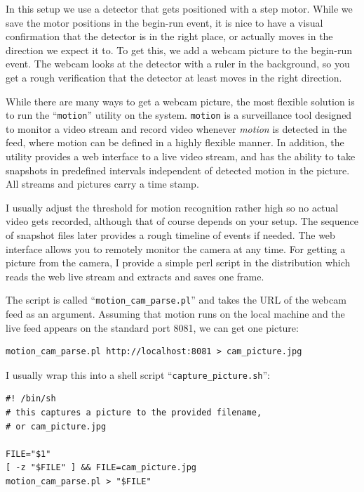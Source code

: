 \documentclass{article}[11pt]
\begin{document}
In this setup we use a detector that gets positioned with a step
motor. While we save the motor positions in the begin-run event, it is
nice to have a visual confirmation that the detector is in the right
place, or actually moves in the direction we expect it to. To get
this, we add a webcam picture to the begin-run event. The webcam looks
at the detector with a ruler in the background, so you get a rough
verification that the detector at least moves in the right direction.

While there are many ways to get a webcam picture, the most flexible
solution is to run the ``\verb|motion|'' utility on the
system. \verb|motion| is a surveillance tool designed to monitor a
video stream and record video whenever \emph{motion} is detected in
the feed, where motion can be defined in a highly flexible manner. In
addition, the utility provides a web interface to a live video stream,
and has the ability to take snapshots in predefined intervals
independent of detected motion in the picture. All streams and
pictures carry a time stamp.

I usually adjust the threshold for motion recognition rather high so
no actual video gets recorded, although that of course depends on your
setup. The sequence of snapshot files later provides a rough
timeline of events if needed. The web interface allows you to remotely
monitor the camera at any time. For getting a picture from the camera,
I provide a simple perl script in the distribution which reads the web
live stream and extracts and saves one frame.

The script is called ``\verb|motion_cam_parse.pl|'' and takes the URL
of the webcam feed as an argument. Assuming that motion runs on the
local machine and the live feed appears on the standard port 8081, we can
get one picture:

\begin{verbatim}
motion_cam_parse.pl http://localhost:8081 > cam_picture.jpg
\end{verbatim}

I usually wrap this into a shell script ``\verb|capture_picture.sh|'':

\begin{verbatim}
#! /bin/sh
# this captures a picture to the provided filename,
# or cam_picture.jpg

FILE="$1"
[ -z "$FILE" ] && FILE=cam_picture.jpg
motion_cam_parse.pl > "$FILE"

\end{verbatim}
\end{document}
